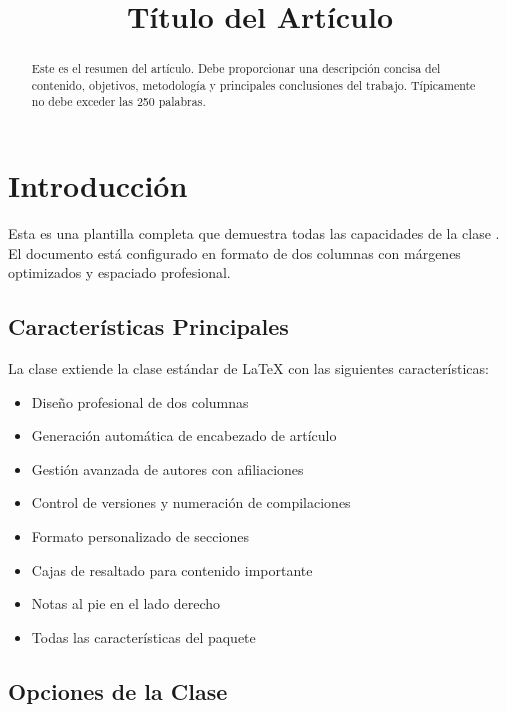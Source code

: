 \documentclass{pt-article}
\title{Título del Artículo}
\begin{document}

\begin{abstract}
Este es el resumen del artículo. Debe proporcionar una descripción concisa
del contenido, objetivos, metodología y principales conclusiones del trabajo.
Típicamente no debe exceder las 250 palabras.
\end{abstract}


\section{Introducción}

Esta es una plantilla completa que demuestra todas las capacidades de la clase
. El documento está configurado en formato de dos columnas
con márgenes optimizados y espaciado profesional.

\subsection{Características Principales}

La clase  extiende la clase estándar 
de \LaTeX{} con las siguientes características:

\begin{itemize}
    \item Diseño profesional de dos columnas
    \item Generación automática de encabezado de artículo
    \item Gestión avanzada de autores con afiliaciones
    \item Control de versiones y numeración de compilaciones
    \item Formato personalizado de secciones
    \item Cajas de resaltado para contenido importante
    \item Notas al pie en el lado derecho
    \item Todas las características del paquete 
\end{itemize}

\subsection{Opciones de la Clase}
\end{document}
